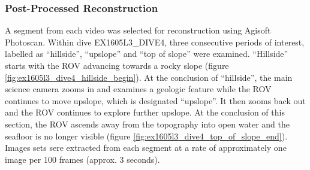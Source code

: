 \documentclass[letterpaper,12pt]{article}
\begin{document}
\subsubsection{Post-Processed Reconstruction}

A segment from each video was selected for reconstruction using Agisoft Photoscan.   Within dive EX1605L3\_DIVE4, three consecutive periods of interest, labelled as ``hillside'', ``upslope'' and ``top of slope'' were examined.   ``Hillside'' starts with the ROV advancing towards a rocky slope (figure \ref{fig:ex1605l3_dive4_hillside_begin}).  At the conclusion of ``hillside'', the main science camera zooms in and examines a geologic feature while the ROV continues to move upslope, which is designated ``upslope''.  It then zooms back out and the ROV continues to explore further upslope.  At the conclusion of this section, the ROV ascends away from the topography into open water and the seafloor is no longer visible (figure \ref{fig:ex1605l3_dive4_top_of_slope_end}).  Images sets sere extracted from each segment at a rate of approximately one image per 100 frames (approx. 3 seconds).
\end{document}
